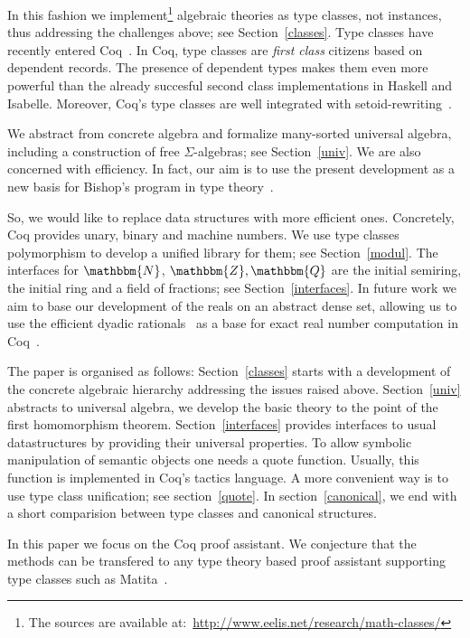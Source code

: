 \documentclass[a4paper,10pt, runningheads]{llncs}
\newcommand{\N}{\ensuremath{\mathbbm{N}}}
\newcommand{\Z}{\ensuremath{\mathbbm{Z}}}
\newcommand{\Q}{\ensuremath{\mathbbm{Q}}}
\begin{document}
In this fashion we implement\footnote{The sources are available
at:~\url{http://www.eelis.net/research/math-classes/}}
 algebraic theories as type classes, not instances, thus addressing the
challenges above; see Section~\ref{classes}. Type classes have recently entered
Coq~\cite{DBLP:conf/tphol/SozeauO08}. In Coq,
type classes are \emph{first class} citizens based on dependent records. The presence of dependent types makes them even more
powerful than the already succesful second class implementations in Haskell and Isabelle. Moreover,
Coq's type classes are well integrated with setoid-rewriting~\cite{Setoid-rewrite}.

We abstract from concrete algebra and formalize many-sorted universal algebra, including a
construction of
free $\Sigma$-algebras; see Section~\ref{univ}. We are also concerned with efficiency.
In fact, our aim is to use the present development as a new basis for Bishop's program in type
theory~\cite{typesreal-article}.

So, we would like to replace data structures with more efficient ones. Concretely,
Coq provides unary, binary and machine numbers. We use type classes polymorphism to
develop a unified library for them; see Section~\ref{modul}.
The interfaces for $\N$, $\Z,\Q$ are the initial semiring, the initial ring and a field of
fractions; see Section~\ref{interfaces}. In future work we aim to base our development of the reals
on an abstract dense set, allowing us to use the efficient dyadic
rationals~\cite{boldo2009combining} as a base for exact real number computation in
Coq~\cite{Riemann,Oconnor:real}.

The paper is organised as follows: Section~\ref{classes} starts with a development of the concrete
algebraic hierarchy addressing the issues raised above. Section~\ref{univ} abstracts to universal
algebra, we develop the basic theory to the point of the first homomorphism theorem.
Section~\ref{interfaces} provides interfaces to usual datastructures by providing their universal
properties. To allow symbolic manipulation of semantic objects one needs a quote function. Usually,
this function is implemented in Coq's tactics language. A more convenient way is to use type class
unification; see section~\ref{quote}. In section~\ref{canonical}, we end with a short comparision
between type classes and canonical structures.

In this paper we focus on the Coq proof assistant. We conjecture that the methods can be transfered
to any type theory based proof assistant supporting type classes such as
Matita~\cite{asperti2007user}.
\end{document}
